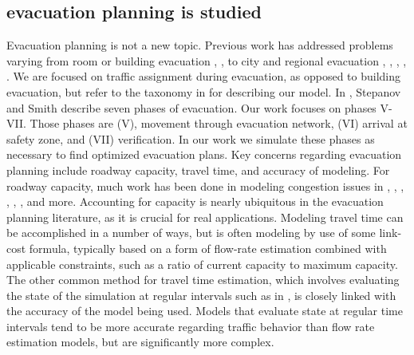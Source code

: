 \documentclass{sig-alternate-05-2015}
\begin{document}
	\subsection{evacuation planning is studied}
	Evacuation planning is not a new topic. 
	Previous work has addressed problems varying from room or building evacuation \cite{thompson1995computer}, \cite{gwynne1999review}, \cite{muhdi2006application} to city and regional evacuation \cite{florida2017evacplan}, \cite{cova2003network}, \cite{lu2004capacity}, \cite{nakajima2007disaster}, \cite{urbina2003national}. We are focused on traffic assignment during evacuation, as opposed to building evacuation, but refer to the taxonomy in \cite{gwynne1999review} for describing our model. 
	In \cite{stepanov2009multi}, Stepanov and Smith describe seven phases of evacuation. Our work focuses on phases V-VII. Those phases are (V), movement through evacuation network, (VI) arrival at safety zone, and (VII) verification. In our work we simulate these phases as necessary to find optimized evacuation plans.
	Key concerns regarding evacuation planning include roadway capacity, travel time, and accuracy of modeling. For roadway capacity, much work has been done in modeling congestion issues in \cite{lu2004capacity}, \cite{chiu2004traffic}, \cite{cova2003network}, \cite{deb2002fast}, \cite{dezani2014optimizing}, \cite{stepanov2009multi}, and more. Accounting for capacity is nearly ubiquitous in the evacuation planning literature, as it is crucial for real applications. Modeling travel time can be accomplished in a number of ways, but is often modeling by use of some link-cost formula, typically based on a form of flow-rate estimation combined with applicable constraints, such as a ratio of current capacity to maximum capacity. The other common method for travel time estimation, which involves evaluating the state of the simulation at regular intervals such as in \cite{chiu2004traffic}, is closely linked with the accuracy of the model being used. Models that evaluate state at regular time intervals tend to be more accurate regarding traffic behavior than flow rate estimation models, but are significantly more complex.  
	
\end{document}
